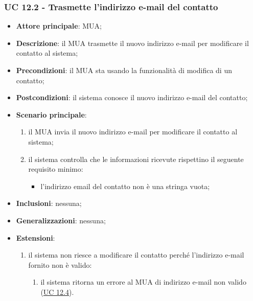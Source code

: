     \subsubsection{UC 12.2 - Trasmette l'indirizzo e-mail del contatto} \label{sec:UC12.2}
    \begin{itemize}
        \item \textbf{Attore principale}: MUA;
        \item \textbf{Descrizione}: il MUA trasmette il nuovo indirizzo e-mail per modificare il contatto al sistema;
        \item \textbf{Precondizioni}: il MUA sta usando la funzionalità di modifica di un contatto;
        \item \textbf{Postcondizioni}: il sistema conosce il nuovo indirizzo e-mail del contatto;
        \item \textbf{Scenario principale}:
            \begin{enumerate}
                \item il MUA invia il nuovo indirizzo e-mail per modificare il contatto al sistema;
                \item il sistema controlla che le informazioni ricevute rispettino il seguente requisito minimo:
                    \begin{itemize}
                        \item l'indirizzo email del contatto non è una stringa vuota;
                    \end{itemize}
            \end{enumerate}
        \item \textbf{Inclusioni}: nessuna;
        \item \textbf{Generalizzazioni}: nessuna;
        \item \textbf{Estensioni}:
            \begin{enumerate}[label=\alph*.]
                \item il sistema non riesce a modificare il contatto perché l'indirizzo e-mail fornito non è valido:
                \begin{enumerate}[label=\arabic*.]
                    \item il sistema ritorna un errore al MUA di indirizzo e-mail non valido (\hyperref[sec:UC12.4]{UC 12.4}).
                \end{enumerate}
            \end{enumerate}
    \end{itemize}


